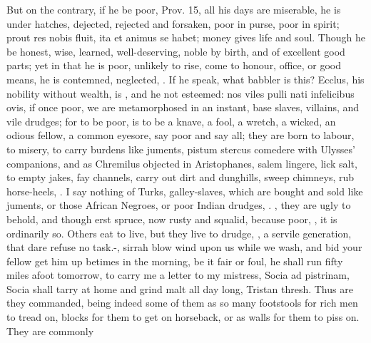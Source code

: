 {{But on the contrary, if he be poor, Prov.  15, all his days are
miserable, he is under hatches, dejected, rejected and forsaken, poor
in purse, poor in spirit; prout res nobis fluit, ita et animus se
habet; money gives life and soul. Though he be honest, wise,
learned, well-deserving, noble by birth, and of excellent good parts;
yet in that he is poor, unlikely to rise, come to honour, office, or
good means, he is contemned, neglected, . If he speak, what babbler is this?
Ecclus, his nobility without wealth, is , and
he not esteemed: nos viles pulli nati infelicibus ovis, if once poor,
we are metamorphosed in an instant, base slaves, villains, and vile
drudges; for to be poor, is to be a knave, a fool, a wretch, a
wicked, an odious fellow, a common eyesore, say poor and say all; they
are born to labour, to misery, to carry burdens like juments, pistum
stercus comedere with Ulysses' companions, and as Chremilus objected in
Aristophanes,  salem lingere, lick salt, to empty jakes, fay
channels, carry out dirt and dunghills, sweep chimneys, rub
horse-heels, \etc{}. I say nothing of Turks, galley-slaves, which are
bought and sold like juments, or those African Negroes, or poor
Indian drudges, .
, they are ugly to behold, and though erst
spruce, now rusty and squalid, because poor, , it is ordinarily so. Others eat to
live, but they live to drudge, , a servile generation, that dare refuse no
task.-, sirrah blow wind upon us while we wash, and bid your fellow
get him up betimes in the morning, be it fair or foul, he shall run
fifty miles afoot tomorrow, to carry me a letter to my mistress, Socia
ad pistrinam, Socia shall tarry at home and grind malt all day long,
Tristan thresh. Thus are they commanded, being indeed some of them as
so many footstools for rich men to tread on, blocks for them to get on
horseback, or as walls for them to piss on. They are commonly
}}
